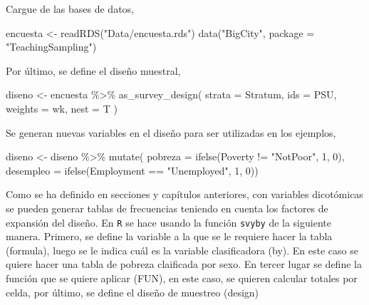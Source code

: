 \documentclass[
  12pt,
]{book}
\newenvironment{Shaded}{\begin{snugshade}}{\end{snugshade}}
\newcommand{\AttributeTok}[1]{\textcolor[rgb]{0.77,0.63,0.00}{#1}}
\newcommand{\DecValTok}[1]{\textcolor[rgb]{0.00,0.00,0.81}{#1}}
\newcommand{\FunctionTok}[1]{\textcolor[rgb]{0.00,0.00,0.00}{#1}}
\newcommand{\NormalTok}[1]{#1}
\newcommand{\OtherTok}[1]{\textcolor[rgb]{0.56,0.35,0.01}{#1}}
\newcommand{\SpecialCharTok}[1]{\textcolor[rgb]{0.00,0.00,0.00}{#1}}
\newcommand{\StringTok}[1]{\textcolor[rgb]{0.31,0.60,0.02}{#1}}
\begin{document}
Cargue de las bases de datos,

\begin{Shaded}
\begin{Highlighting}[]
\NormalTok{encuesta }\OtherTok{\textless{}{-}} \FunctionTok{readRDS}\NormalTok{(}\StringTok{"Data/encuesta.rds"}\NormalTok{)}
\FunctionTok{data}\NormalTok{(}\StringTok{"BigCity"}\NormalTok{, }\AttributeTok{package =} \StringTok{"TeachingSampling"}\NormalTok{)}
\end{Highlighting}
\end{Shaded}

Por último, se define el diseño muestral,

\begin{Shaded}
\begin{Highlighting}[]
\NormalTok{diseno }\OtherTok{\textless{}{-}}\NormalTok{ encuesta }\SpecialCharTok{\%\textgreater{}\%}
  \FunctionTok{as\_survey\_design}\NormalTok{(}
    \AttributeTok{strata =}\NormalTok{ Stratum,}
    \AttributeTok{ids =}\NormalTok{ PSU,}
    \AttributeTok{weights =}\NormalTok{ wk,}
    \AttributeTok{nest =}\NormalTok{ T}
\NormalTok{  )}
\end{Highlighting}
\end{Shaded}

Se generan nuevas variables en el diseño para ser utilizadas en los ejemplos,

\begin{Shaded}
\begin{Highlighting}[]
\NormalTok{diseno }\OtherTok{\textless{}{-}}\NormalTok{ diseno }\SpecialCharTok{\%\textgreater{}\%} \FunctionTok{mutate}\NormalTok{(}
  \AttributeTok{pobreza =} \FunctionTok{ifelse}\NormalTok{(Poverty }\SpecialCharTok{!=} \StringTok{"NotPoor"}\NormalTok{, }\DecValTok{1}\NormalTok{, }\DecValTok{0}\NormalTok{),}
  \AttributeTok{desempleo =} \FunctionTok{ifelse}\NormalTok{(Employment }\SpecialCharTok{==} \StringTok{"Unemployed"}\NormalTok{, }\DecValTok{1}\NormalTok{, }\DecValTok{0}\NormalTok{))}
\end{Highlighting}
\end{Shaded}

Como se ha definido en secciones y capítulos anteriores, con variables dicotómicas se pueden generar tablas de frecuencias teniendo en cuenta los factores de expansión del diseño. En \texttt{R} se hace usando la función \texttt{svyby} de la siguiente manera. Primero, se define la variable a la que se le requiere hacer la tabla (formula), luego se le indica cuál es la variable clasificadora (by). En este caso se quiere hacer una tabla de pobreza claificada por sexo. En tercer lugar se define la función que se quiere aplicar (FUN), en este caso, se quieren calcular totales por celda, por último, se define el diseño de muestreo (design)
\end{document}
